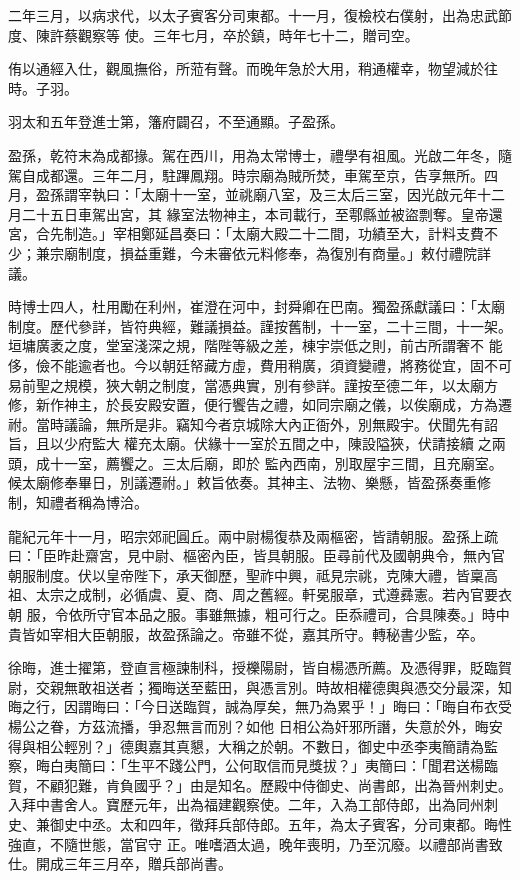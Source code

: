 \begin{pinyinscope}
 二年三月，以病求代，以太子賓客分司東都。十一月，復檢校右僕射，出為忠武節度、陳許蔡觀察等
 使。三年七月，卒於鎮，時年七十二，贈司空。



 侑以通經入仕，觀風撫俗，所蒞有聲。而晚年急於大用，稍通權幸，物望減於往時。子羽。



 羽太和五年登進士第，籓府闢召，不至通顯。子盈孫。



 盈孫，乾符末為成都掾。駕在西川，用為太常博士，禮學有祖風。光啟二年冬，隨駕自成都還。三年二月，駐蹕鳳翔。時宗廟為賊所焚，車駕至京，告享無所。四月，盈孫謂宰執曰：「太廟十一室，並祧廟八室，及三太后三室，因光啟元年十二月二十五日車駕出宮，其
 緣室法物神主，本司載行，至鄠縣並被盜剽奪。皇帝還宮，合先制造。」宰相鄭延昌奏曰：「太廟大殿二十二間，功績至大，計料支費不少；兼宗廟制度，損益重難，今未審依元料修奉，為復別有商量。」敕付禮院詳議。



 時博士四人，杜用勵在利州，崔澄在河中，封舜卿在巴南。獨盈孫獻議曰：「太廟制度。歷代參詳，皆符典經，難議損益。謹按舊制，十一室，二十三間，十一架。垣墉廣袤之度，堂室淺深之規，階陛等級之差，棟宇崇低之則，前古所謂奢不
 能侈，儉不能逾者也。今以朝廷帑藏方虛，費用稍廣，須資變禮，將務從宜，固不可易前聖之規模，狹大朝之制度，當憑典實，別有參詳。謹按至德二年，以太廟方修，新作神主，於長安殿安置，便行饗告之禮，如同宗廟之儀，以俟廟成，方為遷祔。當時議論，無所是非。竊知今者京城除大內正衙外，別無殿宇。伏聞先有詔旨，且以少府監大權充太廟。伏緣十一室於五間之中，陳設隘狹，伏請接續之兩頭，成十一室，薦饗之。三太后廟，即於
 監內西南，別取屋宇三間，且充廟室。候太廟修奉畢日，別議遷祔。」敕旨依奏。其神主、法物、樂懸，皆盈孫奏重修制，知禮者稱為博洽。



 龍紀元年十一月，昭宗郊祀圓丘。兩中尉楊復恭及兩樞密，皆請朝服。盈孫上疏曰：「臣昨赴齋宮，見中尉、樞密內臣，皆具朝服。臣尋前代及國朝典令，無內官朝服制度。伏以皇帝陛下，承天御歷，聖祚中興，祗見宗祧，克陳大禮，皆稟高祖、太宗之成制，必循虞、夏、商、周之舊經。軒冕服章，式遵彞憲。若內官要衣朝
 服，令依所守官本品之服。事雖無據，粗可行之。臣忝禮司，合具陳奏。」時中貴皆如宰相大臣朝服，故盈孫論之。帝雖不從，嘉其所守。轉秘書少監，卒。



 徐晦，進士擢第，登直言極諫制科，授櫟陽尉，皆自楊憑所薦。及憑得罪，貶臨賀尉，交親無敢祖送者；獨晦送至藍田，與憑言別。時故相權德輿與憑交分最深，知晦之行，因謂晦曰：「今日送臨賀，誠為厚矣，無乃為累乎！」晦曰：「晦自布衣受楊公之眷，方茲流播，爭忍無言而別？如他
 日相公為奸邪所譖，失意於外，晦安得與相公輕別？」德輿嘉其真懇，大稱之於朝。不數日，御史中丞李夷簡請為監察，晦白夷簡曰：「生平不踐公門，公何取信而見獎拔？」夷簡曰：「聞君送楊臨賀，不顧犯難，肯負國乎？」由是知名。歷殿中侍御史、尚書郎，出為晉州刺史。入拜中書舍人。寶歷元年，出為福建觀察使。二年，入為工部侍郎，出為同州刺史、兼御史中丞。太和四年，徵拜兵部侍郎。五年，為太子賓客，分司東都。晦性強直，不隨世態，當官守
 正。唯嗜酒太過，晚年喪明，乃至沉廢。以禮部尚書致仕。開成三年三月卒，贈兵部尚書。




\end{pinyinscope}
